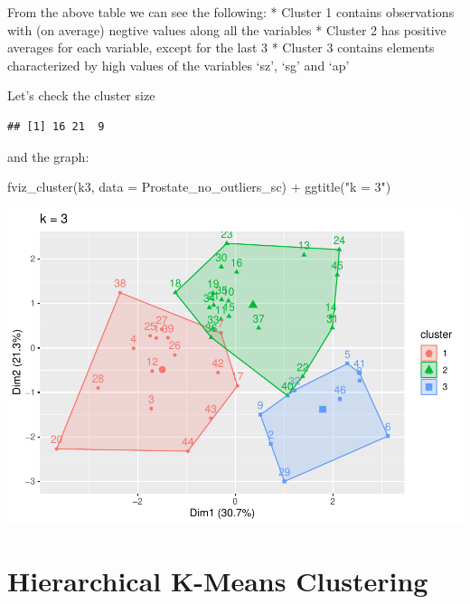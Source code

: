 \documentclass[
]{article}
\newenvironment{Shaded}{\begin{snugshade}}{\end{snugshade}}
\newcommand{\AttributeTok}[1]{\textcolor[rgb]{0.77,0.63,0.00}{#1}}
\newcommand{\FunctionTok}[1]{\textcolor[rgb]{0.00,0.00,0.00}{#1}}
\newcommand{\NormalTok}[1]{#1}
\newcommand{\SpecialCharTok}[1]{\textcolor[rgb]{0.00,0.00,0.00}{#1}}
\newcommand{\StringTok}[1]{\textcolor[rgb]{0.31,0.60,0.02}{#1}}
\begin{document}
From the above table we can see the following: * Cluster 1 contains
observations with (on average) negtive values along all the variables *
Cluster 2 has positive averages for each variable, except for the last 3
* Cluster 3 contains elements characterized by high values of the
variables `sz', `sg' and `ap'

Let's check the cluster size

\begin{Shaded}
\end{Shaded}

\begin{verbatim}
## [1] 16 21  9
\end{verbatim}

and the graph:

\begin{Shaded}
\begin{Highlighting}[]
\FunctionTok{fviz\_cluster}\NormalTok{(k3,  }\AttributeTok{data =}\NormalTok{ Prostate\_no\_outliers\_sc) }\SpecialCharTok{+} \FunctionTok{ggtitle}\NormalTok{(}\StringTok{"k = 3"}\NormalTok{)}
\end{Highlighting}
\end{Shaded}

\includegraphics{clustering_files/figure-latex/unnamed-chunk-66-1.pdf}

\hypertarget{hierarchical-k-means-clustering}{%
\section{Hierarchical K-Means
Clustering}\label{hierarchical-k-means-clustering}}
\end{document}
